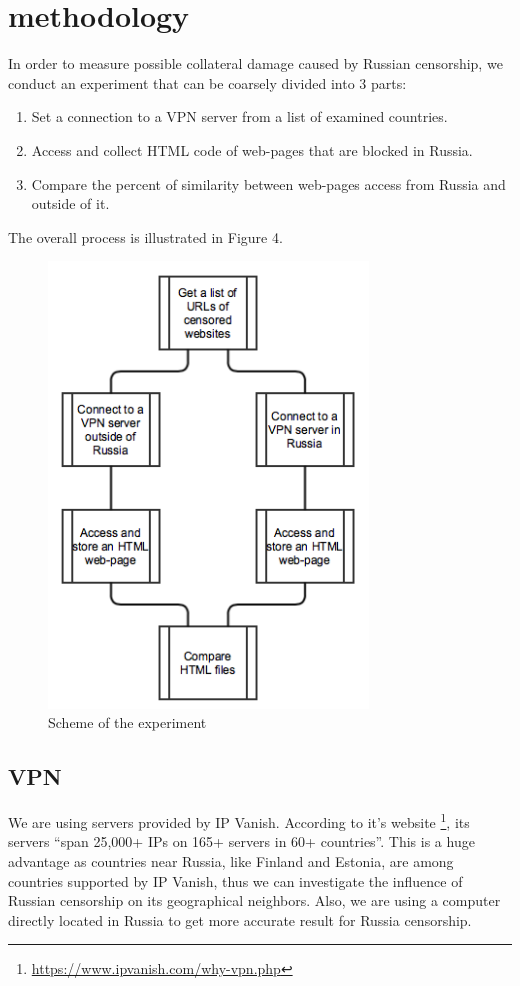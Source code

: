 \documentclass[conference]{IEEEtran}
\begin{document}
\section{methodology}
In order to measure possible collateral damage caused by Russian censorship, we conduct an experiment that can be coarsely divided into 3 parts:
\begin{enumerate}
\item Set a connection to a VPN server from a list of examined countries.
\item Access and collect HTML code of web-pages that are blocked in Russia.
\item Compare the percent of similarity between web-pages access from Russia and outside of it.
\end{enumerate}
The overall process is illustrated in Figure 4.
\begin{figure}[H]
\centering
\includegraphics[width=85mm]{diag1.png}
\caption{Scheme of the experiment \label{diag1}}
\label{fig:fig4}
\end{figure}

\subsection{VPN}
We are using servers provided by IP Vanish.
According to it's website \footnote{\url{https://www.ipvanish.com/why-vpn.php}}, its servers ``span 25,000+ IPs on 165+ servers in 60+ countries''.
This is a huge advantage as countries near Russia, like Finland and Estonia, are among countries supported by
IP Vanish, thus we can investigate the influence of  Russian censorship on its geographical neighbors.
Also, we are using a computer directly located in Russia to get more accurate result for Russia censorship.
\end{document}
